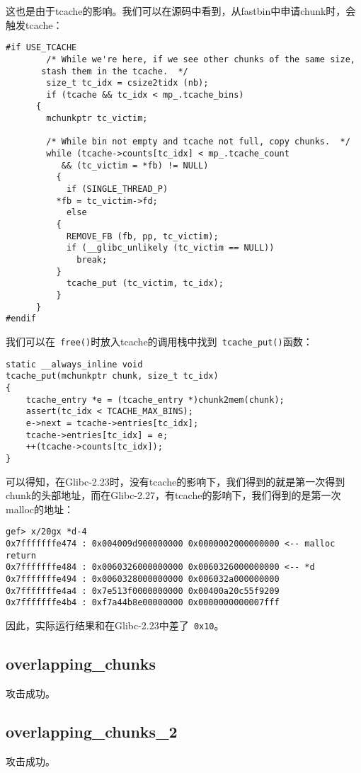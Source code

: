这也是由于tcache的影响。我们可以在源码中看到，从fastbin中申请chunk时，会触发tcache：
\begin{verbatim}
#if USE_TCACHE
        /* While we're here, if we see other chunks of the same size,
       stash them in the tcache.  */
        size_t tc_idx = csize2tidx (nb);
        if (tcache && tc_idx < mp_.tcache_bins)
      {
        mchunkptr tc_victim;

        /* While bin not empty and tcache not full, copy chunks.  */
        while (tcache->counts[tc_idx] < mp_.tcache_count
           && (tc_victim = *fb) != NULL)
          {
            if (SINGLE_THREAD_P)
          *fb = tc_victim->fd;
            else
          {
            REMOVE_FB (fb, pp, tc_victim);
            if (__glibc_unlikely (tc_victim == NULL))
              break;
          }
            tcache_put (tc_victim, tc_idx);
          }
      }
#endif

\end{verbatim}

我们可以在\verb+ free()+时放入tcache的调用栈中找到\verb+ tcache_put()+函数：
\begin{verbatim}
static __always_inline void
tcache_put(mchunkptr chunk, size_t tc_idx)
{
    tcache_entry *e = (tcache_entry *)chunk2mem(chunk);
    assert(tc_idx < TCACHE_MAX_BINS);
    e->next = tcache->entries[tc_idx];
    tcache->entries[tc_idx] = e;
    ++(tcache->counts[tc_idx]);
}

\end{verbatim}

可以得知，在Glibc-2.23时，没有tcache的影响下，我们得到的就是第一次得到chunk的头部地址，而在Glibc-2.27，有tcache的影响下，我们得到的是第一次malloc的地址：
\begin{verbatim}
gef> x/20gx *d-4 
0x7fffffffe474 : 0x004009d900000000 0x0000002000000000 <-- malloc return 
0x7fffffffe484 : 0x0060326000000000 0x0060326000000000 <-- *d 
0x7fffffffe494 : 0x0060328000000000 0x006032a000000000 
0x7fffffffe4a4 : 0x7e513f0000000000 0x00400a20c55f9209 
0x7fffffffe4b4 : 0xf7a44b8e00000000 0x0000000000007fff

\end{verbatim}

因此，实际运行结果和在Glibc-2.23中差了\verb+ 0x10+。


\subsection{overlapping\_chunks}

攻击成功。

\subsection{overlapping\_chunks\_2}

攻击成功。
\newpage